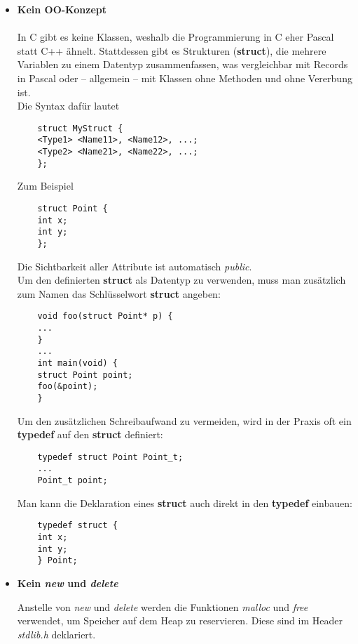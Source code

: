 \begin{itemize}
	\item[] \textbf{Kein OO-Konzept}\\\\
	In C gibt es keine Klassen, weshalb die Programmierung in C eher Pascal statt C++ ähnelt.
	Stattdessen gibt es Strukturen (\textbf{struct}), die mehrere Variablen zu einem Datentyp zusammenfassen, was vergleichbar mit Records in Pascal oder -- allgemein -- mit Klassen ohne Methoden und ohne Vererbung ist.\\
	
	Die Syntax dafür lautet
	\begin{lstlisting}
	struct MyStruct {
	<Type1> <Name11>, <Name12>, ...;
	<Type2> <Name21>, <Name22>, ...;
	};
	\end{lstlisting} 
	
	Zum Beispiel
	\begin{lstlisting}
	struct Point {
	int x;
	int y;
	};
	\end{lstlisting}
	
	Die Sichtbarkeit aller Attribute ist automatisch \emph{public}. \\
	
	Um den definierten \textbf{struct} als Datentyp zu verwenden, muss man zusätzlich zum Namen das Schlüsselwort \textbf{struct} angeben:
	
	\begin{lstlisting}
	void foo(struct Point* p) {
	...
	}
	...
	int main(void) {
	struct Point point;
	foo(&point);
	}
	\end{lstlisting}
	
	Um den zusätzlichen Schreibaufwand zu vermeiden, wird in der Praxis oft ein \textbf{typedef} auf den \textbf{struct} definiert:
	
	\begin{lstlisting}
	typedef struct Point Point_t;
	...
	Point_t point;
	\end{lstlisting}
	
	Man kann die Deklaration eines \textbf{struct} auch direkt in den \textbf{typedef} einbauen:
	\begin{lstlisting}
	typedef struct {
	int x;
	int y;	
	} Point;
	\end{lstlisting}
	
	\item[] \textbf{Kein \emph{new} und \emph{delete}}
	
	Anstelle von \emph{new} und \emph{delete} werden die Funktionen \emph{malloc} und \emph{free} verwendet, um Speicher auf dem Heap zu reservieren. 
	Diese sind im Header \emph{stdlib.h} deklariert.
	

\end{itemize}
